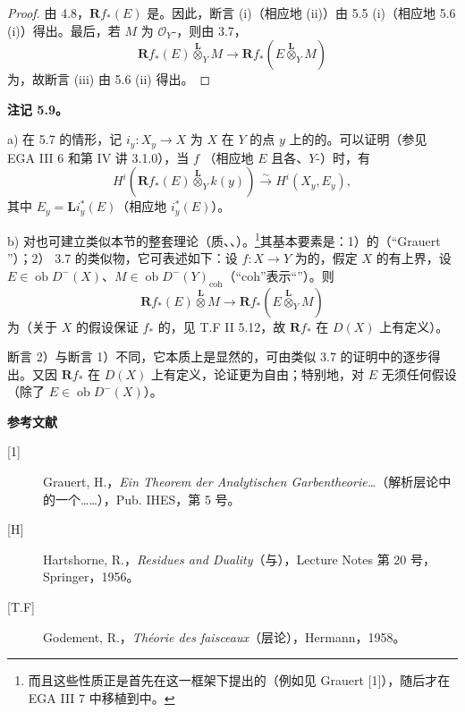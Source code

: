 \begin{proof}
由 4.8，$\mathbf Rf_*(E)$ 是。因此，断言 (i)（相应地 (ii)）由 5.5 (i)（相应地 5.6 (i)）得出。最后，若 $M$ 为 $\mathcal O_Y$-，则由 3.7，
\[
\mathbf Rf_*(E)\mathbin{\overset{\mathbf L}{\otimes}}_YM\longrightarrow
\mathbf Rf_*(E\mathbin{\overset{\mathbf L}{\otimes}}_YM)
\]
为，故断言 (iii) 由 5.6 (ii) 得出。
\end{proof}
\textbf{注记 5.9。}

a) 在 5.7 的情形，记 $i_y:X_y\to X$ 为 $X$ 在 $Y$ 的点 $y$ 上的的。可以证明（参见 EGA III 6 和第 IV 讲 3.1.0），当 $f$ （相应地 $E$ 且各、$Y$-）时，有 
\[
H^i(\mathbf Rf_*(E)\mathbin{\overset{\mathbf L}{\otimes}}_Yk(y))
\xrightarrow{\sim}H^i(X_y,E_y),
\]
其中 $E_y=\mathbf Li_y^*(E)$（相应地 $i_y^*(E)$）。

b) 对也可建立类似本节的整套理论（质、、）。\footnote{而且这些性质正是首先在这一框架下提出的（例如见 Grauert [1]），随后才在 EGA III 7 中移植到中。}其基本要素是：1）的（“Grauert ”）；2） 3.7 的类似物，它可表述如下：设 $f:X\to Y$ 为的，假定 $X$ 的有上界，设 $E\in\operatorname{ob}D^-(X)$、$M\in\operatorname{ob}D^-(Y)_{\mathrm{coh}}$（“coh”表示“”）。则
\[
\mathbf Rf_*(E)\mathbin{\overset{\mathbf L}{\otimes}}M\longrightarrow
\mathbf Rf_*(E\mathbin{\overset{\mathbf L}{\otimes}}_YM)
\]
为（关于 $X$ 的假设保证 $f_*$ 的，见 T.F II 5.12，故 $\mathbf Rf_*$ 在 $D(X)$ 上有定义）。

断言 2）与断言 1）不同，它本质上是显然的，可由类似 3.7 的证明中的逐步得出。又因 $\mathbf Rf_*$ 在 $D(X)$ 上有定义，论证更为自由；特别地，对 $E$ 无须任何假设（除了 $E\in\operatorname{ob}D^-(X)$）。

\textbf{参考文献}
\begin{description}
\item[{[1]}] Grauert, H.，\textit{Ein Theorem der Analytischen Garbentheorie\ldots}（解析层论中的一个……），Pub. IHES，第 5 号。
\item[{[H]}] Hartshorne, R.，\textit{Residues and Duality}（与），Lecture Notes 第 20 号，Springer，1956。
\item[{[T.F]}] Godement, R.，\textit{Théorie des faisceaux}（层论），Hermann，1958。
\end{description}
